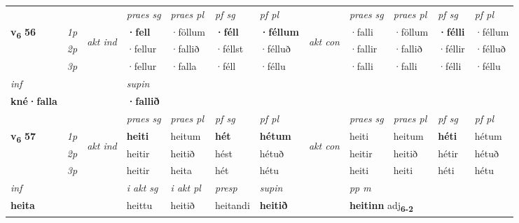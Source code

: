 \begin{longtable}[l]{X>{\footnotesize\itshape}llXXXXlXXXX}
 & &   & \textit{praes sg}  & \textit{praes pl}    & \textit{ pf sg} & \textit{pf pl} & & \textit{praes sg}  & \textit{praes pl}    & \textit{pf sg} & \textit{pf pl }  \\ \cmidrule{4-7} \cmidrule{9-12}
 \multirow{2}{*}{{{\textbf{v{\textsubscript{6}}} \Large{\textbf{56}}}}}  & 1p & \multirow{3}{*}{\begin{turn}{90}\textit{akt ind}\end{turn}} & \textbf{·fell} & ·föllum & \textbf{·féll} & \textbf{·féllum} & \multirow{3}{*}{\begin{turn}{90}\textit{akt con}\end{turn}} &·falli & ·föllum & \textbf{·félli} & ·féllum\\*
 & 2p &  &  ·fellur  & ·fallið & ·féllst & ·félluð & & ·fallir & ·fallið & ·féllir & ·félluð \\*
 & 3p &  & ·fellur & ·falla & ·féll & ·féllu & & ·falli & ·falli& ·félli & ·féllu \\*
\cmidrule{4-7} \cmidrule{9-12}

   {\textit{inf}} & &      & \textit{supin}   \\*
  {\textbf{kné\allowbreak ·falla}} & &      &  \textbf{·fallið}   \\*

\midrule

 & &   & \textit{praes sg}  & \textit{praes pl}    & \textit{ pf sg} & \textit{pf pl} & & \textit{praes sg}  & \textit{praes pl}    & \textit{pf sg} & \textit{pf pl }  \\ \cmidrule{4-7} \cmidrule{9-12}
 \multirow{2}{*}{{{\textbf{v{\textsubscript{6}}} \Large{\textbf{57}}}}}  & 1p & \multirow{3}{*}{\begin{turn}{90}\textit{akt ind}\end{turn}} & \textbf{heiti} & heitum & \textbf{hét} & \textbf{hétum} & \multirow{3}{*}{\begin{turn}{90}\textit{akt con}\end{turn}} &heiti & heitum & \textbf{héti} & hétum\\*
 & 2p &  &  heitir  & heitið & hést & hétuð & & heitir & heitið & hétir & hétuð \\*
 & 3p &  & heitir & heita & hét & hétu & & heiti & heiti& héti & hétu \\*
\cmidrule{4-7} \cmidrule{9-12}

   {\textit{inf}} & &  & \textit{i akt sg} & \textit{i akt pl}   & \textit{presp} & \textit{supin}  && \textit{pp m} \\*
  {\textbf{heita}} & && heittu  & heitið   & heitandi &  \textbf{heitið}  && \multicolumn{2}{l}{\textbf{heitinn} adj\textbf{\textsubscript{6-2}}} \\*


\end{longtable}
